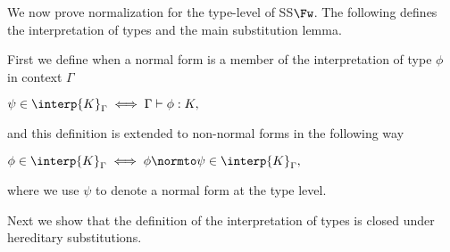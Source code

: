 We now prove normalization for the type-level of SS$\Fw$.  The
following defines the interpretation of types and the main
substitution lemma.

\begin{definition}
  \label{def:interpretation_of_types_ssfw}
  First we define when a normal form is a member of the interpretation of type $\phi$ in context $\Gamma$
  \begin{center}
    \begin{math}
      \psi \in \interp{K}_\Gamma \iff \Gamma \vdash \phi:K,
  \end{math}
  \end{center}
  and this definition is extended to non-normal forms in the following way
  \begin{center}
    \begin{math}
      \phi \in \interp{K}_\Gamma \iff \phi \normto \psi \in \interp{K}_\Gamma,
  \end{math}
  \end{center}
 where we use $\psi$ to denote a normal form at the type level.
\end{definition}

\noindent 
Next we show that the definition of the interpretation of types is closed under
hereditary substitutions.  

